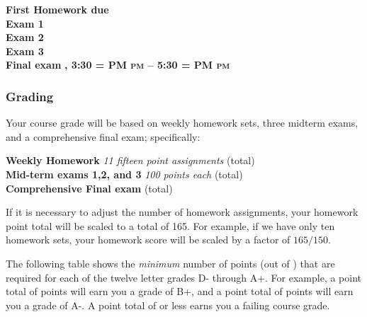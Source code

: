 \documentclass[12pt]{article}
\makeatletter
\newcounter{ex}\setcounter{ex}{0}
\newenvironment{mypar}[2]
  {\begin{list}{}%
    {\setlength\leftmargin{#1}
    \setlength\rightmargin{#2}}
    \item[]}
  {\end{list}}
\DeclareRobustCommand{\maybefakesc}[1]{%
  \ifnum\pdfstrcmp{\f@series}{\bfdefault}=\z@
    {\fontsize{\dimexpr0.8\dimexpr\f@size pt\relax}{0}\selectfont\uppercase{#1}}%
  \else
    \textsc{#1}%
  \fi
}
\newcommand\PM{\maybefakesc{pm}\xspace}
\makeatother
\begin{document}
\begin{mypar}{0.25in}{0.25in} 

      \textbf{First Homework due} \dotfill  \textbf{}  \\
       \textbf{Exam 1} \dotfill \textbf{}  \\
    \textbf{Exam 2} \dotfill  \textbf{} \\
    \textbf{Exam 3} \dotfill \textbf{} \\
      \textbf{Final exam} \dotfill  \textbf{, 3:30 \PM  --  5:30 \PM}
\end{mypar}



\subsubsection*{Grading}

Your course grade will be based on weekly homework sets, three midterm exams, and a comprehensive 
final exam; specifically:
\begin{mypar}{0.25in}{0.25in}
    \textbf{Weekly Homework}  \emph{11 fifteen point assignments}   (total) \\
    \textbf{Mid-term exams 1,2, and 3} \emph{100 points each}  (total)\\
      \textbf{Comprehensive Final exam}  (total)
\end{mypar}
If it is necessary to adjust the number of  homework assignments,  your homework point 
total will be scaled to a total of 165.  For example, if we have only ten homework sets, 
your homework score will be scaled by a factor of \(165/150\).





The following table shows the \emph{minimum} number of points (out of \points) that
are required for each of the twelve letter grades D- through A+. For
example, a point total of \Bp\/  points will earn you a grade of B+,  and 
a point total of \Am\/ points will earn you a grade of A-. A point
total of \F\/  or less earns you a failing course grade.
 
\end{document}
